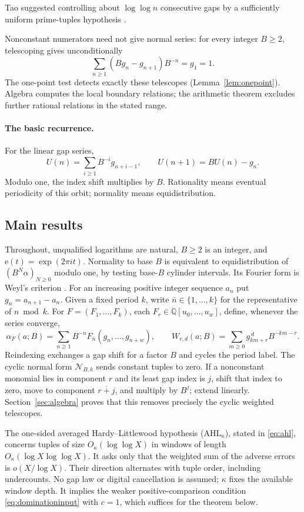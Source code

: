 \documentclass[11pt,a4paper]{article}
\newcommand{\e}{\mathrm e}
\newcommand{\Q}{\mathbb Q}
\begin{document}
Tao suggested controlling about $\log\log n$ consecutive gaps by a
sufficiently uniform prime-tuples hypothesis \cite{taoforum}.

Nonconstant numerators need not give normal series: for every
integer $B\ge2$, telescoping gives unconditionally
\[
 \sum_{n\ge1}(Bg_n-g_{n+1})B^{-n}=g_1=1.
\]
The one-point test detects exactly these telescopes (Lemma~\ref{lem:onepoint}).
Algebra computes the local boundary relations; the arithmetic theorem
excludes further rational relations in the stated range.

\paragraph{The basic recurrence.}
For the linear gap series,
\[
 U(n)=\sum_{i\ge1}B^{-i}g_{n+i-1},\qquad U(n+1)=BU(n)-g_n.
\]
Modulo one, the index shift multiplies by $B$. Rationality means eventual
periodicity of this orbit; normality means equidistribution.

\subsection{Main results}\label{sec:mainresults}

Throughout, unqualified logarithms are natural, $B\ge2$ is an integer,
and $\e(t)=\exp(2\pi i t)$.
Normality to base $B$ is equivalent to equidistribution of $(B^N\alpha)_{N\ge0}$
modulo one, by testing base-$B$ cylinder intervals. Its Fourier form
is Weyl's criterion \cite{weyl}. For an increasing positive
integer sequence $a_n$ put $g_n=a_{n+1}-a_n$. Given a fixed period $k$,
write $\bar n\in\{1,\ldots,k\}$ for the representative of $n\bmod k$.
For $F=(F_1,\ldots,F_k)$, each $F_r\in\Q[u_0,\ldots,u_w]$, define,
whenever the series converge,
\[
 \alpha_F(a;B)=\sum_{n\ge1}B^{-n}F_{\bar n}(g_n,\ldots,g_{n+w}),
 \qquad
 W_{r,d}(a;B)=\sum_{m\ge0}g_{km+r}^{\,d}B^{-km-r}.
\]
Reindexing exchanges a gap shift for a factor $B$ and cycles the
period label. The cyclic normal form $\mathcal N_{B,k}$ sends constant
tuples to zero.
If a nonconstant monomial lies in component $r$ and its least gap index is
$j$, shift that index to zero, move to component $\overline{r+j}$, and
multiply by $B^j$; extend linearly.
Section~\ref{sec:algebra} proves that this removes precisely the
cyclic weighted telescopes.

The one-sided averaged Hardy--Littlewood hypothesis
\textup{(AHL$_\kappa$)}, stated in \eqref{eq:ahl}, concerns
tuples of size $O_\kappa(\log\log X)$ in windows of length
$O_\kappa(\log X\log\log X)$. It asks only that the weighted sum of
the adverse errors is $o(X/\log X)$. Their direction alternates with
tuple order, including undercounts. No gap law or digital cancellation
is assumed; $\kappa$ fixes the available window depth.
It implies the weaker positive-comparison condition
\eqref{eq:dominationinput} with $c=1$, which suffices for the theorem below.
\end{document}
